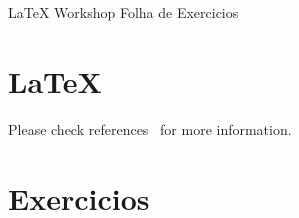 \begin{center}
\centerline{\LaTeX{} Workshop Folha de Exercicios}
\end{center}

\section{\LaTeX{}} 
\hspace{1pt}
\vspace{1pt}

Please check references~\cite{oetiker2010not,forbes2011documentation} for more information.


\section{Exercicios}
\hspace{1pt}

\vspace{1pt}

